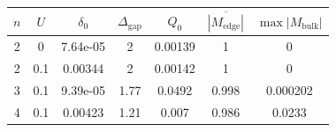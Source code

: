 \begin{tabular}{c c c c c c c}
\hline
$n$ & $U$ & $\delta_0$ & $\Delta_{\mathrm{gap}}$ & $Q_0$ & $\overline{|M_{\mathrm{edge}}|}$ & $\max |M_{\mathrm{bulk}}|$ \\
\hline
2 & 0 & 7.64e-05 & 2 & 0.00139 & 1 & 0 \\
2 & 0.1 & 0.00344 & 2 & 0.00142 & 1 & 0 \\
3 & 0.1 & 9.39e-05 & 1.77 & 0.0492 & 0.998 & 0.000202 \\
4 & 0.1 & 0.00423 & 1.21 & 0.007 & 0.986 & 0.0233 \\
\hline
\end{tabular}
